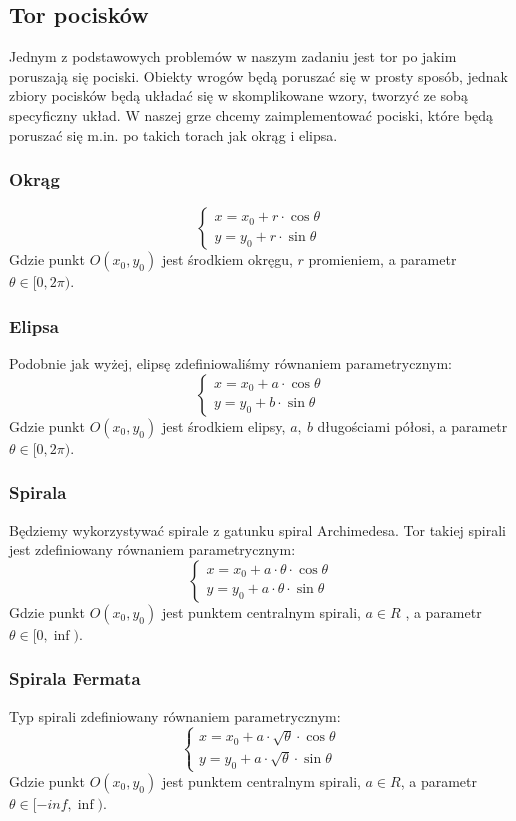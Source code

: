 \documentclass[a4paper,twoside]{article}
\begin{document}
	\subsection{Tor pocisków}
	Jednym z podstawowych problemów w naszym zadaniu jest tor po jakim poruszają się pociski. Obiekty wrogów będą poruszać się w prosty sposób, jednak zbiory pocisków będą układać się w skomplikowane wzory, tworzyć ze sobą specyficzny układ. W naszej grze chcemy zaimplementować pociski, które będą poruszać się m.in. po takich torach jak okrąg i elipsa.\\
	
	\subsubsection{Okrąg}
	$$
	\begin{cases}
	x=x_0+r\cdot \cos{\theta}\\
	y=y_0+r\cdot \sin{\theta}
	\end{cases}
	$$
	Gdzie punkt $ O(x_0, y_0) $ jest środkiem okręgu, $ r $ promieniem, a parametr $ \theta \in [0, 2\pi ) $.
	\subsubsection{Elipsa}
	Podobnie jak wyżej, elipsę zdefiniowaliśmy równaniem parametrycznym:
	$$
	\begin{cases}
	x=x_0+a\cdot \cos{\theta}\\
	y=y_0+b\cdot \sin{\theta}
	\end{cases}
	$$
	Gdzie punkt $ O(x_0, y_0) $ jest środkiem elipsy, $ a,\:b $ długościami półosi, a parametr $ \theta \in [0, 2\pi ) $.
	\subsubsection{Spirala}
	Będziemy wykorzystywać spirale z gatunku spiral Archimedesa. Tor takiej spirali jest zdefiniowany równaniem parametrycznym:
	$$
	\begin{cases}
	x=x_0+a\cdot \theta \cdot \cos{\theta}\\
	y=y_0+a\cdot \theta \cdot \sin{\theta}
	\end{cases}
	$$
	Gdzie punkt $ O(x_0, y_0) $ jest punktem centralnym spirali, $ a \in R $ , a parametr $ \theta \in [0, \inf ) $.
	\subsubsection{Spirala Fermata}
	Typ spirali zdefiniowany równaniem parametrycznym:
	$$
	\begin{cases}
	x=x_0+a\cdot \sqrt{\theta} \cdot \cos{\theta}\\
	y=y_0+a\cdot \sqrt{\theta} \cdot \sin{\theta}
	\end{cases}
	$$
	Gdzie punkt $ O(x_0, y_0) $ jest punktem centralnym spirali, $ a \in R $, a parametr $ \theta \in [-inf, \inf ) $.
\end{document}
